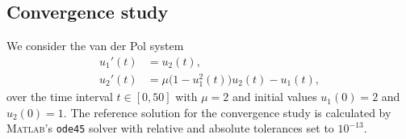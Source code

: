 \documentclass{siamltex}  %
\begin{document}
\subsection{Convergence study}\label{subsec:convergence}
We consider the van der Pol system \cite{Hairer1987_book}
\begin{equation}\label{eq:conv_eq}
	\begin{split}
    		u_1'(t) &= u_2(t), \\
                u_2'(t) &= \mu \bigl(1 - u_1^2(t)\bigr)u_2(t) - u_1(t),
    \end{split}
\end{equation}
over the time interval $t \in [0, 50]$ with $\mu = 2$ and initial
values $u_1(0) = 2$ and $u_2(0) = 1$.
The reference solution for the convergence study is calculated by \textsc{Matlab}'s 
\texttt{ode45} solver with relative and absolute tolerances set to $10^{-13}$.
\end{document}
